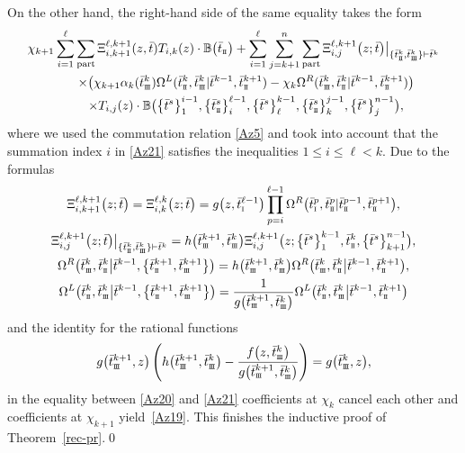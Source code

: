 \documentclass[pdftex]{sigma}
\newcommand{\so}{\scriptscriptstyle \rm I}
\newcommand{\st}{\scriptscriptstyle \rm I\hspace{-1pt}I}
\newcommand{\sth}{\scriptscriptstyle \rm I\hspace{-1pt}I\hspace{-1pt}I}
\newcommand{\bt}{{\bar t}}
\theoremstyle{definition}
\def\BB{{\mathbb{B}}}
\def\r#1{\eqref{#1}}
\def\vk{\chi}
\def\Oml{\Omega^L}
\def\Omr{\Omega^R}
\begin{document}
On the other hand, the right-hand side of the same equality takes the form
\begin{gather}
\vk_{k+1} \sum_{i=1}^\ell\sum_{\rm part}\Xi^{\ell,k+1}_{i,k+1}(z,\bt) T_{i,k}(z)\cdot \BB\bigl(\bt_{\st}\bigr)+
\sum_{i=1}^\ell\sum_{j=k+1}^n\sum_{\rm part} \Xi^{\ell,k+1}_{i,j}\bigl(z;\bt\bigr)
\big|_{\{\bt^k_{\st},\bt^k_{\sth}\}\vdash\bt^k}\nonumber\\
\qquad\times
\bigl(\vk_{k+1} \alpha_k(\bt^k_{\sth})
\Oml(\bt^k_{\st},\bt^k_{\sth}|\bt^{k-1},\bt^{k+1}_{\st})
-\vk_k \Omr(\bt^k_{\sth},\bt^k_{\st}|\bt^{k-1},\bt^{k+1}_{\st})\bigr)\nonumber\\
\qquad\times
T_{i,j}(z)\cdot\BB\bigl(\bigl\{\bt^s\bigr\}_{1}^{i-1},\bigl\{\bt^s_{\st}\bigr\}_{i}^{\ell-1},\bigl\{\bt^s\bigr\}_{\ell}^{k-1},
\bigl\{\bt^s_{\st}\bigr\}_{k}^{j-1},\bigl\{\bt^s\bigr\}_{j}^{n-1}\bigr) ,\label{Az21}
\end{gather}
where we used the commutation relation \r{Az5} and took into account that
the summation index $i$ in \r{Az21} satisfies the inequalities $1\leq i\leq \ell< k$.
Due to the formulas
\begin{gather*}
\Xi^{\ell,k+1}_{i,k+1}\bigl(z;\bt\bigr)=\Xi^{\ell,k}_{i,k}\bigl(z;\bt\bigr)=g\bigl(z,\bt^{\ell-1}_{\so}\bigr)
\prod_{p=i}^{\ell-1}\Omr\bigl(\bt^{p}_{\so},\bt^{p}_{\st}|\bt^{p-1}_{\st},\bt^{p+1}_{\st}\bigr) ,\\
\Xi^{\ell,k+1}_{i,j}\bigl(z;\bt\bigr)
\big|_{\{\bt^k_{\st},\bt^k_{\sth}\}\vdash\bt^k}=
h\bigl(\bt^{k+1}_{\sth},\bt^k_{\sth}\bigr)
\Xi^{\ell,k+1}_{i,j}\bigl(z;\bigl\{\bt^s\bigr\}_{1}^{k-1},
\bt^k_{\st},\bigl\{\bt^s\bigr\}_{k+1}^{n-1}\bigr),
\\
\Omr\bigl(\bt^{k}_{\sth},\bt^{k}_{\st}\big|\bt^{k-1},\bigl\{\bt^{k+1}_{\st},\bt^{k+1}_{\sth}\bigr\}\bigr) =
h\bigl(\bt^{k+1}_{\sth},\bt^k_{\sth}\bigr)
\Omr\bigl(\bt^{k}_{\sth},\bt^{k}_{\st}\big|\bt^{k-1},\bt^{k+1}_{\st}\bigr) ,
\\
\Oml\bigl(\bt^{k}_{\st},\bt^{k}_{\sth}\big|\bt^{k-1},\bigl\{\bt^{k+1}_{\st},\bt^{k+1}_{\sth}\bigr\}\bigr) =
\frac{1}{g\bigl(\bt^{k+1}_{\sth},\bt^k_{\sth}\bigr)}
\Oml\bigl(\bt^{k}_{\st},\bt^{k}_{\sth}\big|\bt^{k-1},\bt^{k+1}_{\st}\bigr)
\end{gather*}
and the identity for the rational functions
\begin{equation*}
g\bigl(\bt^{k+1}_{\sth},z\bigr)\left(h\bigl(\bt^{k+1}_{\sth},\bt^k_{\sth}\bigr)-
\frac{f\bigl(z,\bt^k_{\sth}\bigr)}{g\bigl(\bt^{k+1}_{\sth},\bt^k_{\sth}\bigr)}\right)=g\bigl(\bt^k_{\sth},z\bigr),
\end{equation*}
in the equality between \r{Az20} and \r{Az21} coefficients at $\vk_k$ cancel each other and coefficients at $\vk_{k+1}$ yield~\r{Az19}.
This finishes the inductive proof of Theorem~\ref{rec-pr}.\qed
\end{document}
